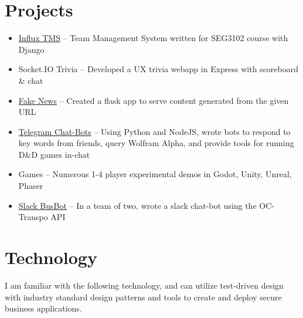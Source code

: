 \documentclass[]{rcf_cv}
\begin{document}
	\section{Projects}
		\begin{itemize}
			\setlength\itemsep{-0.4em}
			\renewcommand\labelitemi{--}
			
			\item \href{https://github.com/RyanFleck/Influx}{Influx TMS} -- Team Management System written for SEG3102 course with Django
			
			\item Socket.IO Trivia -- Developed a UX trivia webapp in Express with scoreboard \& chat
			
			\item \href{https://github.com/RyanFleck/Fake-News}{Fake News} -- Created a flask app to serve content generated from the given URL
			
			\item \href{https://github.com/RyanFleck/Telegram-Dungeon}{Telegram Chat-Bots} -- Using Python and NodeJS, wrote bots to respond to key words from friends, query Wolfram Alpha, and provide tools for running D\&D games in-chat
			
			\item Games -- Numerous 1-4 player experimental demos in Godot, Unity, Unreal, Phaser
			
			\item \href{https://github.com/morch028/BusBot}{Slack BusBot} -- In a team of two, wrote a slack chat-bot using the OC-Transpo API
			

			
		\end{itemize}

	\section{Technology}
	
		I am familiar with the following technology, and can utilize test-driven design with industry standard design patterns and tools to create and deploy secure business applications.
	\textcolor[rgb]{0.99,0.99,0.99}{
	\scalebox{.001}{ %
	Address: 1205 - 180 Lees Ave Ottawa, Ontario K1S 5J6, 
	City: Ottawa, Province: Ontario ON,
	Name: Ryan Fleck,
	Email: Ryan.Fleck@protonmail.com,
	GitHub: RyanFleck, https://github.com/RyanFleck/
	Stack Overflow: https://stackoverflow.com/users/9899022/ryan-fleck
	Version Control: Git, Github, Microsoft TFS.
	Automated testing with python and selenium.			
	Innovative, Daring, Computer Science, Computer Engineering
	Experience programmer. Computer programmer, 
	Full-stack, 
	Mobile Phone: +1 (613) 501 4043
	Phone: 6135014043
	University: University of Ottawa, 
	Degree Type: Bachelor's Degree, 
	Major: Computer Engineering,	 
	Start: September 2015
	End: April 2021
	Concurrent Java programming.
	Asynchronous JavaScript programming.
	SCRUM, AGILE, technical innovator.			
	} %
	}\\
	
\end{document}

